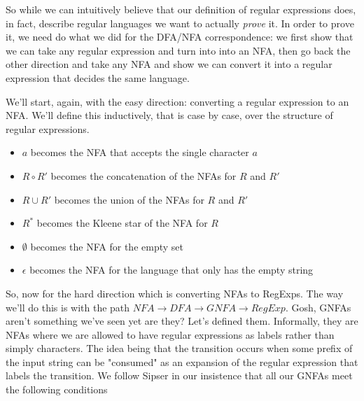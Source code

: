 \documentclass[11pt]{article}
\begin{document}
So while we can intuitively believe that our definition of regular expressions does, in fact, describe regular languages we want to actually \emph{prove} it. In order to prove it, we need do what we did for the DFA/NFA correspondence: we first show that we can take any regular expression and turn into into an NFA, then go back the other direction and take any NFA and show we can convert it into a regular expression that decides the same language.

We'll start, again, with the easy direction: converting a regular expression to an NFA. We'll define this inductively, that is case by case, over the structure of regular expressions.

\begin{itemize}
\item $a$ becomes the NFA that accepts the single character $a$
\item $R \circ R'$ becomes the concatenation of the NFAs for $R$ and $R'$
\item $R \cup R'$ becomes the union of the NFAs for $R$ and $R'$
\item $R^*$ becomes the Kleene star of the NFA for $R$
\item $\emptyset$ becomes the NFA for the empty set
\item $\epsilon$ becomes the NFA for the language that only has the empty string
\end{itemize}

So, now for the hard direction which is converting NFAs to RegExps. The way we'll do this is with the path $NFA \to DFA \to GNFA \to RegExp$. Gosh, GNFAs aren't something we've seen yet are they? Let's defined them. Informally, they are NFAs where we are allowed to have regular expressions as labels rather than simply characters. The idea being that the transition occurs when some prefix of the input string can be "consumed" as an expansion of the regular expression that labels the transition. We follow Sipser in our insistence that all our GNFAs meet the following conditions
\end{document}
